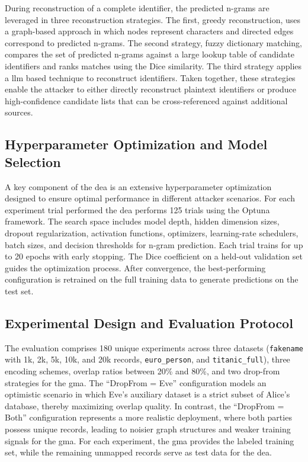 \documentclass[a4paper,11pt]{scrartcl}
\begin{document}
During reconstruction of a complete identifier, the predicted n-grams are leveraged in three reconstruction strategies. 
The first, greedy reconstruction, uses a graph-based approach in which nodes represent characters and directed edges correspond to predicted n-grams.
The second strategy, fuzzy dictionary matching, compares the set of predicted n-grams against a large lookup table of candidate identifiers and ranks matches using the Dice similarity. 
The third strategy applies a \ac{llm} based technique to reconstruct identifiers. 
Taken together, these strategies enable the attacker to either directly reconstruct plaintext identifiers or produce high-confidence candidate lists that can be cross-referenced against additional sources.

\subsection{Hyperparameter Optimization and Model Selection}
A key component of the \ac{dea} is an extensive hyperparameter optimization designed to ensure optimal performance in different attacker scenarios. 
For each experiment trial performed the \ac{dea} performs 125 trials using the Optuna framework. 
The search space includes model depth, hidden dimension sizes, dropout regularization, activation functions, optimizers, learning-rate schedulers, batch sizes, and decision thresholds for n-gram prediction. 
Each trial trains for up to 20 epochs with early stopping. 
The Dice coefficient on a held-out validation set guides the optimization process. 
After convergence, the best-performing configuration is retrained on the full training data to generate predictions on the test set.


\subsection{Experimental Design and Evaluation Protocol}
The evaluation comprises 180 unique experiments across three datasets (\texttt{fakename} with 1k, 2k, 5k, 10k, and 20k records, \texttt{euro\_person}, and \texttt{titanic\_full}), three encoding schemes, overlap ratios between 20\% and 80\%, and two drop-from strategies for the \ac{gma}. 
The ``DropFrom = Eve'' configuration models an optimistic scenario in which Eve’s auxiliary dataset is a strict subset of Alice’s database, thereby maximizing overlap quality. 
In contrast, the ``DropFrom = Both'' configuration represents a more realistic deployment, where both parties possess unique records, leading to noisier graph structures and weaker training signals for the \ac{gma}. 
For each experiment, the \ac{gma} provides the labeled training set, while the remaining unmapped records serve as test data for the \ac{dea}. 
\end{document}
